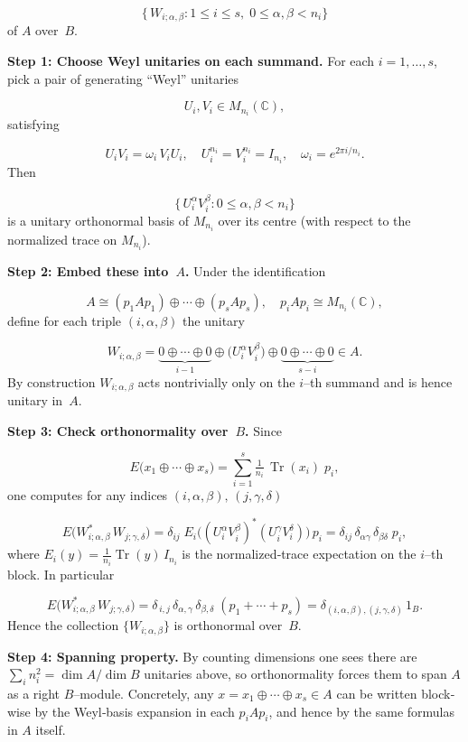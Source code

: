 \documentclass[11pt]{article}
\theoremstyle{mytheoremstyle}
\theoremstyle{definition}
\theoremstyle{remark}
\DeclareMathOperator{\Tr}{Tr}
\begin{document}
$$ 
  \bigl\{\,W_{i;\alpha,\beta}:1\le i\le s,\;0\le\alpha,\beta<n_i\bigr\} 
$$ 
of $A$ over~$B$.

\medskip
\noindent\textbf{Step 1: Choose Weyl unitaries on each summand.} For each $i=1,\dots,s$, pick a pair of generating “Weyl” unitaries

\[
  U_i,V_i\in M_{n_i}(\mathbb{C}),
\]
satisfying

\[
  U_i V_i =\omega_i\,V_i U_i,
  \quad
  U_i^{n_i}=V_i^{n_i}=I_{n_i},
  \quad
  \omega_i=e^{2\pi i/n_i}.
\]
Then

\[
  \bigl\{\,U_i^\alpha V_i^\beta
  : 0\le\alpha,\beta<n_i\bigr\}
\]
is a unitary orthonormal basis of $M_{n_i}$ over its centre
(with respect to the normalized trace on $M_{n_i}$).

\medskip
\noindent\textbf{Step 2: Embed these into~$A$.} Under the identification

\[
  A \cong (p_1Ap_1)\oplus\cdots\oplus(p_sAp_s), \quad
  p_iAp_i\cong M_{n_i}(\mathbb{C}),
\]
define for each triple $(i,\alpha,\beta)$ the unitary

\[
  W_{i;\alpha,\beta}
  = 
  \underbrace{0\oplus\cdots\oplus 0}_{i-1}
  \oplus
  \bigl(U_i^\alpha V_i^\beta\bigr)
  \oplus
  \underbrace{0\oplus\cdots\oplus 0}_{s-i}
  \in A.
\]
By construction $W_{i;\alpha,\beta}$ acts nontrivially only on the
$i$–th summand and is hence unitary in~$A$.

\medskip
\noindent\textbf{Step 3: Check orthonormality over~$B$.} Since 

\[
  E\bigl(x_1\oplus\cdots\oplus x_s\bigr)
  =\sum_{i=1}^s\tfrac1{n_i}\,\Tr(x_i)\;p_i,
\]
one computes for any indices $(i,\alpha,\beta),\,(j,\gamma,\delta)$

\[
  E\bigl(W_{i;\alpha,\beta}^* \,W_{j;\gamma,\delta}\bigr)
  =\delta_{ij}\; 
  E_i\!\bigl((U_i^\alpha V_i^\beta)^* (U_i^\gamma V_i^\delta)\bigr)\,p_i
  =\delta_{ij}\,\delta_{\alpha\gamma}\,\delta_{\beta\delta}\;p_i,
\]
where
\( E_i(y)=\tfrac1{n_i}\Tr(y)\,I_{n_i} \)
is the normalized‐trace expectation on the $i$–th block.  In particular

\[
  E\bigl(W_{i;\alpha,\beta}^* \,W_{j;\gamma,\delta}\bigr)
  = \delta_{\,i,j}\,\delta_{\alpha,\gamma}\,\delta_{\beta,\delta}
    \;(p_1+\cdots+p_s)
  =\delta_{(i,\alpha,\beta),(j,\gamma,\delta)}\,1_B.
\]
Hence the collection $\{W_{i;\alpha,\beta}\}$ is orthonormal over~$B$.

\medskip
\noindent\textbf{Step 4: Spanning property.} By counting dimensions one sees there are
\( \sum_i n_i^2=\dim A/\dim B \) 
unitaries above, so orthonormality forces them to span $A$ as a right
$B$–module.  Concretely, any
$x=x_1\oplus\cdots\oplus x_s\in A$
can be written block‐wise by the Weyl‐basis expansion in each
$p_iAp_i$, and hence by the same formulas in $A$ itself.
\end{document}
